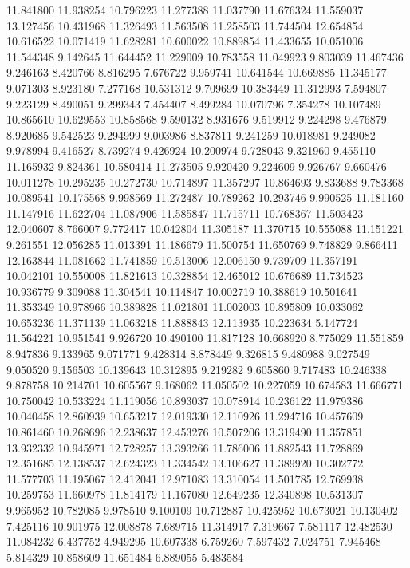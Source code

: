 11.841800
11.938254
10.796223
11.277388
11.037790
11.676324
11.559037
13.127456
10.431968
11.326493
11.563508
11.258503
11.744504
12.654854
10.616522
10.071419
11.628281
10.600022
10.889854
11.433655
10.051006
11.544348
9.142645
11.644452
11.229009
10.783558
11.049923
9.803039
11.467436
9.246163
8.420766
8.816295
7.676722
9.959741
10.641544
10.669885
11.345177
9.071303
8.923180
7.277168
10.531312
9.709699
10.383449
11.312993
7.594807
9.223129
8.490051
9.299343
7.454407
8.499284
10.070796
7.354278
10.107489
10.865610
10.629553
10.858568
9.590132
8.931676
9.519912
9.224298
9.476879
8.920685
9.542523
9.294999
9.003986
8.837811
9.241259
10.018981
9.249082
9.978994
9.416527
8.739274
9.426924
10.200974
9.728043
9.321960
9.455110
11.165932
9.824361
10.580414
11.273505
9.920420
9.224609
9.926767
9.660476
10.011278
10.295235
10.272730
10.714897
11.357297
10.864693
9.833688
9.783368
10.089541
10.175568
9.998569
11.272487
10.789262
10.293746
9.990525
11.181160
11.147916
11.622704
11.087906
11.585847
11.715711
10.768367
11.503423
12.040607
8.766007
9.772417
10.042804
11.305187
11.370715
10.555088
11.151221
9.261551
12.056285
11.013391
11.186679
11.500754
11.650769
9.748829
9.866411
12.163844
11.081662
11.741859
10.513006
12.006150
9.739709
11.357191
10.042101
10.550008
11.821613
10.328854
12.465012
10.676689
11.734523
10.936779
9.309088
11.304541
10.114847
10.002719
10.388619
10.501641
11.353349
10.978966
10.389828
11.021801
11.002003
10.895809
10.033062
10.653236
11.371139
11.063218
11.888843
12.113935
10.223634
5.147724
11.564221
10.951541
9.926720
10.490100
11.817128
10.668920
8.775029
11.551859
8.947836
9.133965
9.071771
9.428314
8.878449
9.326815
9.480988
9.027549
9.050520
9.156503
10.139643
10.312895
9.219282
9.605860
9.717483
10.246338
9.878758
10.214701
10.605567
9.168062
11.050502
10.227059
10.674583
11.666771
10.750042
10.533224
11.119056
10.893037
10.078914
10.236122
11.979386
10.040458
12.860939
10.653217
12.019330
12.110926
11.294716
10.457609
10.861460
10.268696
12.238637
12.453276
10.507206
13.319490
11.357851
13.932332
10.945971
12.728257
13.393266
11.786006
11.882543
11.728869
12.351685
12.138537
12.624323
11.334542
13.106627
11.389920
10.302772
11.577703
11.195067
12.412041
12.971083
13.310054
11.501785
12.769938
10.259753
11.660978
11.814179
11.167080
12.649235
12.340898
10.531307
9.965952
10.782085
9.978510
9.100109
10.712887
10.425952
10.673021
10.130402
7.425116
10.901975
12.008878
7.689715
11.314917
7.319667
7.581117
12.482530
11.084232
6.437752
4.949295
10.607338
6.759260
7.597432
7.024751
7.945468
5.814329
10.858609
11.651484
6.889055
5.483584
